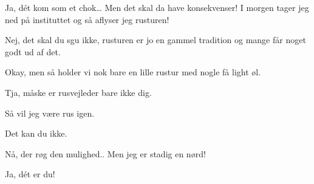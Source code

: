 \documentclass[a4paper,11pt]{article}
\begin{document}
\begin{sketch}
 Ja, dét kom som et chok… Men det skal da have konsekvenser! I morgen tager jeg ned på instituttet og så aflyser jeg rusturen!

 Nej, det skal du sgu ikke, rusturen er jo en gammel tradition og mange får noget godt ud af det.

 Okay, men så holder vi nok bare en lille rustur med nogle få light øl.

 Tja, måske er rusvejleder bare ikke dig.

 Så vil jeg være rus igen.

 Det kan du ikke.

 Nå, der røg den mulighed.. Men jeg er stadig en nørd!

 Ja, dét er du!

\end{sketch}
\end{document}
